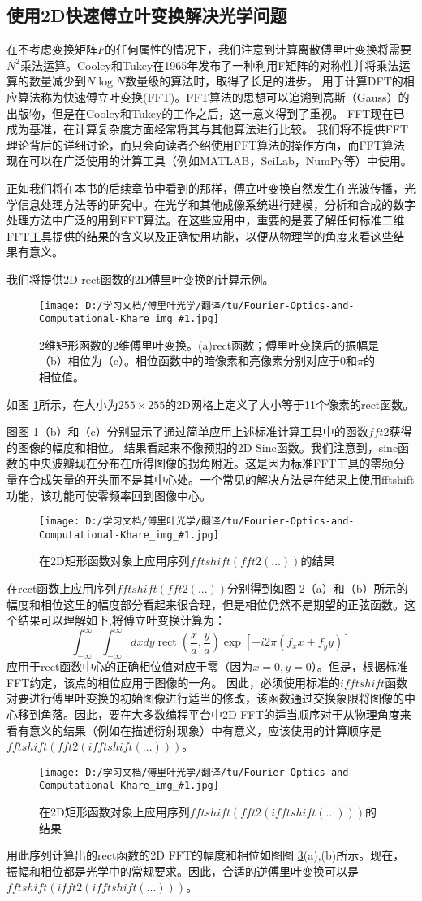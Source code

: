 \documentclass[12pt, UTF8]{ctexart}%
\numberwithin{equation}{section}
\numberwithin{figure}{section}
\newcommand {\InsertPic}[3]{\begin{figure}[htbp]\centering \texttt{[image: D:/学习文档/傅里叶光学/翻译/tu/Fourier-Optics-and-Computational-Khare\_img\_\#1.jpg]}\caption{#3}  \label{#2}\end{figure}}%
\def\Emphasize#1{\textcolor[rgb]{1,0,0}{#1}}
\newcommand{\InsertEqution}[2]{\begin{equation}
  \label{#1}
   #2
 \end{equation}}
\newcommand{\InsertInlineEq}[1]{$#1$}
\newcommand{\RefFig}[1]{图 \ref{#1}}
\begin{document}
\begin{sloppypar}
\subsection{使用2D快速傅立叶变换解决光学问题}
在不考虑变换矩阵\InsertInlineEq{F}的任何属性的情况下，我们注意到计算离散傅里叶变换将需要\InsertInlineEq{N^2}乘法运算。Cooley和Tukey在1965年发布了一种利用F矩阵的对称性并将乘法运算的数量减少到\InsertInlineEq{N\log N}数量级的算法时，取得了长足的进步。
  用于计算DFT的相应算法称为快速傅立叶变换(FFT)。FFT算法的思想可以追溯到高斯（Gauss）的出版物，但是在Cooley和Tukey的工作之后，这一意义得到了重视。 FFT现在已成为基准，在计算复杂度方面经常将其与其他算法进行比较。 我们将不提供FFT理论背后的详细讨论，而只会向读者介绍使用FFT算法的操作方面，而FFT算法现在可以在广泛使用的计算工具（例如MATLAB，SciLab，NumPy等）中使用。

  正如我们将在本书的后续章节中看到的那样，傅立叶变换自然发生在光波传播，光学信息处理方法等的研究中。在光学和其他成像系统进行建模，分析和合成的数字处理方法中广泛的用到FFT算法。在这些应用中，重要的是要了解任何标准二维FFT工具提供的结果的含义以及正确使用功能，以便从物理学的角度来看这些结果有意义。

  我们将提供2D rect函数的2D傅里叶变换的计算示例。\InsertPic{16}{F4.1}{2维矩形函数的2维傅里叶变换。(a)rect函数；傅里叶变换后的振幅是（b）相位为（c）。相位函数中的暗像素和亮像素分别对应于0和\InsertInlineEq{\pi}的相位值。}如\RefFig{F4.1}所示，在大小为\InsertInlineEq{255\times255}的2D网格上定义了大小等于11个像素的rect函数。

  图\RefFig{F4.1}（b）和（c）分别显示了通过简单应用上述标准计算工具中的函数\InsertInlineEq{fft2}获得的图像的幅度和相位。 结果看起来不像预期的2D Sinc函数。我们注意到，sinc函数的中央波瓣现在分布在所得图像的拐角附近。这是因为标准FFT工具的零频分量在合成矢量的开头而不是其中心处。一个常见的解决方法是在结果上使用fftshift功能，该功能可使零频率回到图像中心。\InsertPic{17}{F4.2}{在2D矩形函数对象上应用序列\InsertInlineEq{fftshift(fft2(...))}的结果}
  在rect函数上应用序列\InsertInlineEq{fftshift(fft2(...))}分别得到如\RefFig{F4.2}（a）和（b）所示的幅度和相位这里的幅度部分看起来很合理，但是相位仍然不是期望的正弦函数。这个结果可以理解如下,将傅立叶变换计算为：\InsertEqution{4.7}{\int_{-\infty}^{\infty} \int_{-\infty}^{\infty} d x d y \operatorname{rect}\left(\frac{x}{a}, \frac{y}{a}\right) \exp \left[-i 2 \pi\left(f_{x} x+f_{y} y\right)\right]}应用于rect函数中心的正确相位值对应于零（因为\InsertInlineEq{x=0,y=0}）。但是，根据标准FFT约定，该点的相位应用于图像的一角。 因此，必须使用标准的\InsertInlineEq{ifftshift}函数对要进行傅里叶变换的初始图像进行适当的修改，该函数通过交换象限将图像的中心移到角落。因此，要在大多数编程平台中2D FFT的适当顺序对于从物理角度来看有意义的结果（例如在描述衍射现象）中有意义，应该使用的计算顺序是\Emphasize{\InsertInlineEq{fftshift(fft2(ifftshift(...)))}}。
  \InsertPic{18}{F4.3}{在2D矩形函数对象上应用序列\InsertInlineEq{fftshift(fft2(ifftshift(...)))}的结果}
  用此序列计算出的rect函数的2D FFT的幅度和相位如图\RefFig{F4.3}(a),(b)所示。现在，振幅和相位都是光学中的常规要求。因此，合适的逆傅里叶变换可以是\Emphasize{\InsertInlineEq{fftshift(ifft2(ifftshift(...)))}}。


\end{sloppypar}
\end{document}
